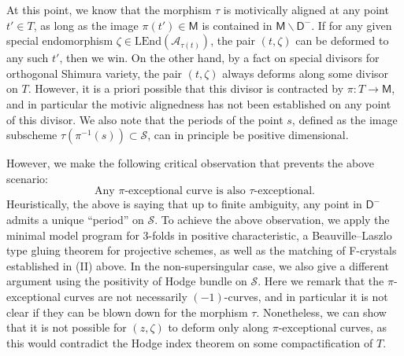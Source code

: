 \documentclass[11pt, letterpaper]{amsart}
\theoremstyle{plain}
\theoremstyle{definition}
\newcommand{\<}{\langle}
\renewcommand{\>}{\rangle}
\newcommand{\shS}{\mathscr{S}}
\newcommand{\sfD}{\mathsf{D}}
\newcommand{\sfM}{\mathsf{M}}
\newcommand{\sA}{\mathcal{A}}
\newcommand{\LEnd}{\mathrm{LEnd}}
\begin{document}
At this point, we know that the morphism $\tau$ is motivically aligned at any point $t' \in T$, as long as the image $\pi(t')\in \sfM$ is contained in $\sfM\smallsetminus \sfD^-$. 
If for any given special endomorphism $\zeta\in \LEnd(\sA_{\tau(t)})$, the pair $(t, \zeta)$ can be deformed to any such $t'$, then we win. 
On the other hand, by a fact on special divisors for orthogonal Shimura variety, the pair $(t, \zeta)$ always deforms along some divisor on $T$.
However, it is a priori possible that this divisor is contracted by $\pi : T \to \sfM$, and in particular the motivic alignedness has not been established on any point of this divisor.
We also note that the periods of the point $s$, defined as the image subscheme $\tau(\pi^{-1}(s)) \subset \shS$, can in principle be positive dimensional. 

However, we make the following critical observation that prevents the above scenario:
\begin{equation*}
	\label{eqn: exceptional}
	\text{Any $\pi$-exceptional curve is also $\tau$-exceptional.} 
\end{equation*}
Heuristically, the above is saying that up to finite ambiguity, any point in $\sfD^-$ admits a unique ``period'' on $\shS$. 
To achieve the above observation, we apply the minimal model program for 3-folds in positive characteristic, a Beauville--Laszlo  type gluing theorem for projective schemes, as well as the matching of F-crystals established in (II) above. 
In the non-supersingular case, we also give a different argument using the positivity of Hodge bundle on $\shS$. 
Here we remark that the $\pi$-exceptional curves are not necessarily $(-1)$-curves, and in particular it is not clear if they can be blown down for the morphism $\tau$. 
Nonetheless, we can show that it is not possible for $(z, \zeta)$ to deform only along $\pi$-exceptional curves, as this would contradict the Hodge index theorem on some compactification of $T$. 
\end{document}
